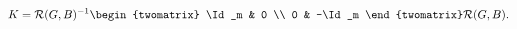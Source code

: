 \begin{equation}
\label{eq:Kdiag}
  K = \mathcal{R}(G,B)^{-1} \begin{twomatrix}
                              \Id_m &    0 \\
                                0   & -\Id_m
                            \end{twomatrix} \mathcal{R}(G,B).
\end{equation}

